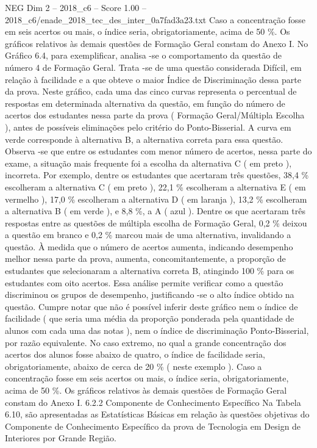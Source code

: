 \begin{textsample}{NEG Dim 2 – 2018\_c6 – Score 1.00 – 2018\_c6/enade\_2018\_tec\_des\_inter\_0a7fad3a23.txt}
Caso a concentração fosse em seis acertos ou mais, o índice seria, obrigatoriamente, acima de 50 \%.
Os gráficos relativos às demais questões de Formação Geral constam do Anexo I.
No Gráfico 6.4, para exemplificar, analisa -se o comportamento da questão de número 4 de Formação Geral.
Trata -se de uma questão considerada Difícil, em relação à facilidade e a que obteve o maior Índice de Discriminação dessa parte da prova.
Neste gráfico, cada uma das cinco curvas representa o percentual de respostas em determinada alternativa da questão, em função do número de acertos dos estudantes nessa parte da prova ( Formação Geral/Múltipla Escolha ), antes de possíveis eliminações pelo critério do Ponto-Bisserial.
A curva em verde corresponde à alternativa B, a alternativa correta para essa questão.
Observa -se que entre os estudantes com menor número de acertos, nessa parte do exame, a situação mais frequente foi a escolha da alternativa C ( em preto ), incorreta.
Por exemplo, dentre os estudantes que acertaram três questões, 38,4 \% escolheram a alternativa C ( em preto ), 22,1 \% escolheram a alternativa E ( em vermelho ), 17,0 \% escolheram a alternativa D ( em laranja ), 13,2 \% escolheram a alternativa B ( em verde ), e 8,8 \%, a A ( azul ).
Dentre os que acertaram três respostas entre as questões de múltipla escolha de Formação Geral, 0,2 \% deixou a questão em branco e 0,2 \% marcou mais de uma alternativa, invalidando a questão.
À medida que o número de acertos aumenta, indicando desempenho melhor nessa parte da prova, aumenta, concomitantemente, a proporção de estudantes que selecionaram a alternativa correta B, atingindo 100 \% para os estudantes com oito acertos.
Essa análise permite verificar como a questão discriminou os grupos de desempenho, justificando -se o alto índice obtido na questão.
Cumpre notar que não é possível inferir deste gráfico nem o índice de facilidade ( que seria uma média da proporção ponderada pela quantidade de alunos com cada uma das notas ), nem o índice de discriminação Ponto-Bisserial, por razão equivalente.
No caso extremo, no qual a grande concentração dos acertos dos alunos fosse abaixo de quatro, o índice de facilidade seria, obrigatoriamente, abaixo de cerca de 20 \% ( neste exemplo ).
Caso a concentração fosse em seis acertos ou mais, o índice seria, obrigatoriamente, acima de 50 \%.
Os gráficos relativos às demais questões de Formação Geral constam do Anexo I. 6.2.2 Componente de Conhecimento Específico Na Tabela 6.10, são apresentadas as Estatísticas Básicas em relação às questões objetivas do Componente de Conhecimento Específico da prova de Tecnologia em Design de Interiores por Grande Região.

\end{textsample}
